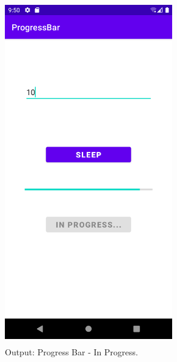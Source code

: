 \documentclass[12pt, a4]{article}
\begin{document}
\subsection*{}
\begin{figure}[h]
\centering
\caption{Output: Progress Bar - In Progress.}
\includegraphics[height=15cm, width=7.3cm]{ProgressBar/Screenshots/Output-3.png}
\end{figure}


\newpage
\subsection*{}
\begin{flushleft}

\end{flushleft}

\newpage
\subsection*{}
\begin{flushleft}

\end{flushleft}
\end{document}
